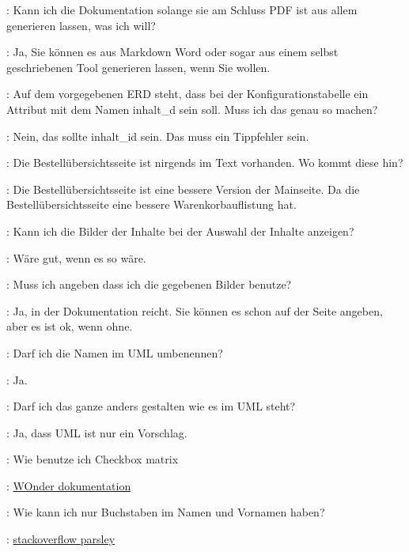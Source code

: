 \documentclass[a4paper, 11pt]{article}
\begin{document}
\begin{drama}

\msspeaks: Kann ich die Dokumentation solange sie am Schluss PDF ist aus allem generieren lassen, was ich will?

\dozentspeaks: Ja, Sie können es aus Markdown Word oder sogar aus einem selbst geschriebenen Tool generieren lassen, wenn Sie wollen.

\msspeaks: Auf dem vorgegebenen ERD steht, dass bei der Konfigurationstabelle ein Attribut mit dem Namen inhalt\_d sein soll. Muss ich das genau so machen?

\dozentspeaks: Nein, das sollte inhalt\_id sein. Das muss ein Tippfehler sein.

\msspeaks: Die Bestellübersichtsseite ist nirgends im Text vorhanden. Wo kommt diese hin?

\dozentspeaks: Die Bestellübersichtsseite ist eine bessere Version der Mainseite. Da die Bestellübersichtsseite eine bessere Warenkorbauflistung hat.

\msspeaks: Kann ich die Bilder der Inhalte bei der Auswahl der Inhalte anzeigen?

\dozentspeaks: Wäre gut, wenn es so wäre.

\msspeaks: Muss ich angeben dass ich die gegebenen Bilder benutze?

\dozentspeaks: Ja, in der Dokumentation reicht. Sie können es schon auf der Seite angeben, aber es ist ok, wenn ohne.

\msspeaks: Darf ich die Namen im UML umbenennen?

\dozentspeaks: Ja.

\msspeaks: Darf ich das ganze anders gestalten wie es im UML steht?

\dozentspeaks: Ja, dass UML ist nur ein Vorschlag.

\msspeaks: Wie benutze ich Checkbox matrix

\internetspeaks: \href{https://github.com/wocommunity/wonder/blob/4d7f6bf9236c3005359101d6f3c9e6224d47750e/Frameworks/Core/JavaWOExtensions/Sources/com/webobjects/woextensions/WOCheckboxMatrix.java}{WOnder dokumentation}

\msspeaks: Wie kann ich nur Buchstaben im Namen und Vornamen haben?

\internetspeaks: \href{https://stackoverflow.com/questions/23415795/how-to-only-allow-text-in-parsely-js-validation}{stackoverflow parsley}


\end{drama}
\end{document}
